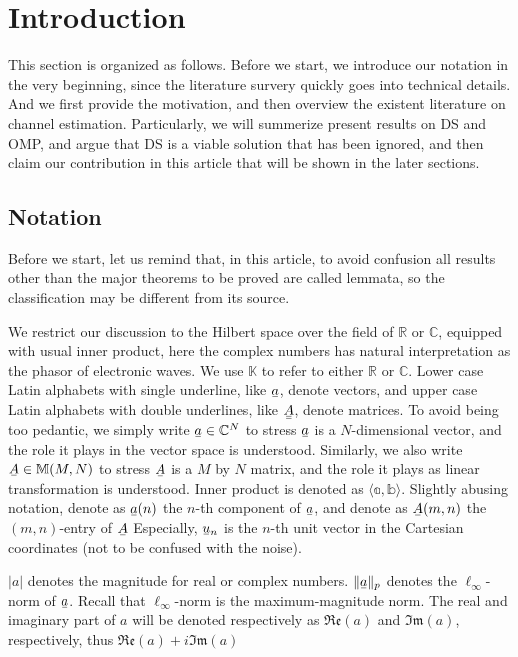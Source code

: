 \documentclass[12pt]{article}
\newcommand{\MB}[1]{\mathbb{#1}}
\newcommand{\MF}[1]{\mathfrak{#1}}
\newcommand{\V}[1]{\stackunder[1.2pt]{$#1$}{\rule{.9ex}{.075ex}}}
\newcommand{\M}[1]{\V{\V{#1}}}
\newcommand{\IP}[1]{\langle #1 \rangle}
\begin{document}
\section{Introduction}

This section is organized as follows.
Before we start, we introduce our notation in the very beginning, since the literature survery quickly goes into technical details.
And we first provide the motivation, and then overview the existent literature on channel estimation.
Particularly, we will summerize present results on DS and OMP, and argue that DS is a viable solution that has been ignored, and then claim our contribution in this article that will be shown in the later sections.

\subsection{Notation}

Before we start, let us remind that, in this article, to avoid confusion all results other than the major theorems to be proved are called lemmata, so the classification may be different from its source.

We restrict our discussion to the Hilbert space over the field of \(\MB{R}\) or \(\MB{C}\), equipped with usual inner product, here the complex numbers has natural interpretation as the phasor of electronic waves.
We use \(\MB{K}\) to refer to either \(\MB{R}\) or \(\MB{C}\).
Lower case Latin alphabets with single underline, like \(\V{a}\), denote vectors, and upper case Latin alphabets with double underlines, like \(\M{A}\), denote matrices.
To avoid being too pedantic, we simply write \(\V{a} \in \MB{C}^N\) to stress \(\V{a}\) is a \(N\)-dimensional vector, and the role it plays in the vector space is understood.
Similarly, we also write \(\V{A} \in \MB{M}(M,N)\) to stress \(\V{A}\) is a \(M\) by \(N\) matrix, and the role it plays as linear transformation is understood.
Inner product is denoted as \(\IP{ \MB{a}, \MB{b} }\).
Slightly abusing notation, denote as \(\V{a}(n)\) the \(n\)-th component of \(\V{a}\), and denote as \(\V{A}(m,n)\) the \((m,n)\)-entry of \(\V{A}\)
Especially, \(\V{u}_n\) is the \(n\)-th unit vector in the Cartesian coordinates (not to be confused with the noise).

\(|a|\) denotes the magnitude for real or complex numbers.
\(\|\V{a}\|_p\) denotes the \(\ell_\infty\)-norm of \(\V{a}\).
Recall that \(\ell_\infty\)-norm is the maximum-magnitude norm.
The real and imaginary part of \(a\) will be denoted respectively as \(\MF{Re}(a)\) and \(\MF{Im}(a)\), respectively, thus \(\MF{Re}(a) +i \MF{Im}(a)\)
\end{document}
